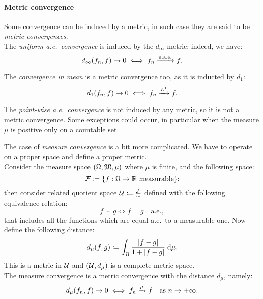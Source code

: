 %
%

\paragraph{Metric convergence} 
Some convergence can be induced by a metric, in such case they are said to be \emph{metric convergences}.\\
The \textit{uniform a.e.\ convergence} is induced by the $d_\infty$ metric; indeed, we have:
$$
	d_\infty(f_n,f) 
	\to 0 
	\iff f_n 
	\xrightarrow{\text{u.a.e.}} f
.
$$

The \textit{convergence in mean} is a metric convergence too, as it is inducted by $d_1$:
$$
	d_1(f_n,f) 
	\to 0 
	\iff f_n 
	\xrightarrow{L^{1}} f
.
$$

The \textit{point-wise a.e.\ convergence} is not induced by any metric, so it is not a metric convergence. Some exceptions could occur, in particular when the measure $\mu$ is positive only on a countable set.

The case of \textit{measure convergence} is a bit more complicated. We have to operate on a proper space and define a proper metric.\\
Consider the measure space $(\Omega, \mathfrak M, \mu)$ where $\mu$ is finite, and the following space:
$$
	\mathcal F 
	\coloneqq \{f:\Omega \to \mathbb R \text{ measurable}\}
;
$$
then consider related quotient space $\mathcal U \coloneqq \frac{\mathcal F}{\sim}$ defined with the following equivalence relation:
$$
	f
	\sim g 
	\iff 
	f
	=g 
	\quad \text{a.e.}
,
$$
that includes all the functions which are equal a.e.\ to a measurable one.
Now define the following distance:
$$
	d_\mu(f,g) 
	\coloneqq \int_\Omega \frac{|f-g|}{1+|f-g|} \; \mathrm d\mu
.$$
This is a metric in $\mathcal U$ and $(\mathcal U, d_\mu)$ is a complete metric space.\\
The measure convergence is a metric convergence with the distance $d_\mu$, namely:
$$
	d_\mu(f_n,f) 
	\to 0 
	\iff 
	f_n 
	\xrightarrow{\mu} f 
	\quad \text{as } n \to +\infty
.
$$

